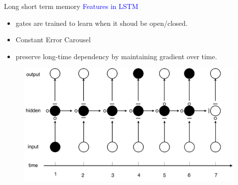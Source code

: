 		\begin{frame}[t]{Long short term memory}
		\textcolor{blue}{\Large Features in LSTM}
		 \begin{itemize}
		  \item gates are trained to learn when it shoud be open/closed. 
		  \item Constant Error Carousel
		  \item preserve long-time dependency by maintaining gradient over time. 
		 \end{itemize}
		 \begin{figure}
		  \includegraphics[width=\textwidth]{LSTMGra.png}
		 \end{figure}


		\end{frame}

